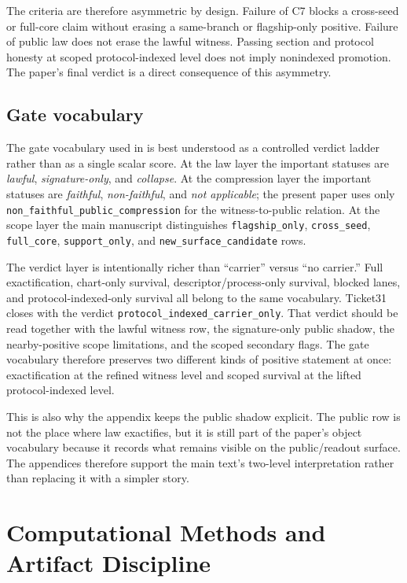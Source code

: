 \documentclass[11pt]{article}
\theoremstyle{definition}
\begin{document}
The criteria are therefore asymmetric by design. Failure of C7 blocks a cross-seed or
full-core claim without erasing a same-branch or flagship-only positive. Failure of public
law does not erase the lawful witness. Passing section and protocol honesty at scoped
protocol-indexed level does not imply nonindexed promotion. The paper's final verdict is a
direct consequence of this asymmetry.

\subsection{Gate vocabulary}

The gate vocabulary used in  is best understood as
a controlled verdict ladder rather than as a single scalar score. At the law layer the
important statuses are \emph{lawful}, \emph{signature-only}, and \emph{collapse}. At the
compression layer the important statuses are \emph{faithful}, \emph{non-faithful}, and
\emph{not applicable}; the present paper uses only
\texttt{non\_faithful\_public\_compression} for the witness-to-public relation. At the
scope layer the main manuscript distinguishes \texttt{flagship\_only},
\texttt{cross\_seed}, \texttt{full\_core}, \texttt{support\_only}, and
\texttt{new\_surface\_candidate} rows.

The verdict layer is intentionally richer than ``carrier'' versus ``no carrier.'' Full
exactification, chart-only survival, descriptor/process-only survival, blocked lanes, and
protocol-indexed-only survival all belong to the same vocabulary. Ticket31 closes with the
verdict \texttt{protocol\_indexed\_carrier\_only}. That verdict should be read together
with the lawful witness row, the signature-only public shadow, the nearby-positive scope
limitations, and the scoped secondary flags. The gate vocabulary therefore preserves two
different kinds of positive statement at once: exactification at the refined witness level
and scoped survival at the lifted protocol-indexed level.

This is also why the appendix keeps the public shadow explicit. The public row is not the
place where law exactifies, but it is still part of the paper's object vocabulary because
it records what remains visible on the public/readout surface. The appendices therefore
support the main text's two-level interpretation rather than replacing it with a simpler
story.
 \section{Computational Methods and Artifact Discipline}
\label{app:computational-methods-and-artifact-discipline}
\end{document}
